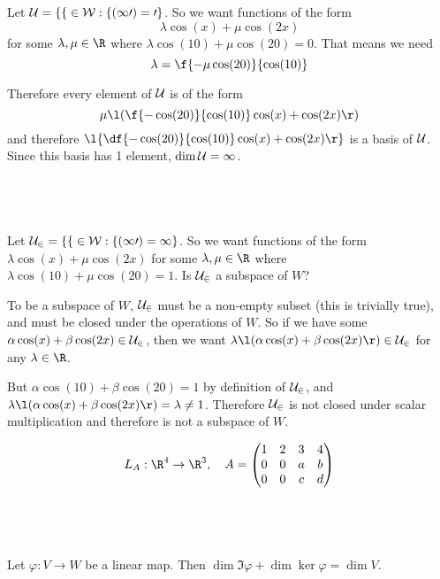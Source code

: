 \documentclass[a4paper]{article}
\begin{document}
Let $\cal U = \{ f \in W : f(10) = 0 \}$. So we want functions of the form $$\lambda \cos(x) + \mu \cos(2x)$$
for some $\lambda, \mu \in \R$ where $\lambda \cos(10) + \mu \cos(20) = 0$. That means we need $$\lambda = \f{-\mu \cos(20)}{\cos(10)}$$

Therefore every element of $\cal U$ is of the form $$\mu \l(\f{-\cos(20)}{\cos(10)} \cos(x) + \cos(2x) \r)$$
and therefore $\l\{ \df{-\cos(20)}{\cos(10)} \cos(x) + \cos(2x) \r\}$ is a basis of $\cal U$. Since this basis has 1 element, $\dim \cal U = 1$.

\subsection{~}

Let $\cal U_2 = \{ f \in W : f(10) = 1 \}$. So we want functions of the form $\lambda \cos(x) + \mu \cos(2x)$ for some $\lambda, \mu \in \R$ where $\lambda \cos(10) + \mu \cos(20) = 1$. Is $\cal U_2$ a subspace of $W$?

To be a subspace of $W$, $\cal U_2$ must be a non-empty subset (this is trivially true), and must be closed under the operations of $W$. So if we have some $\alpha \cos(x) + \beta \cos(2x) \in \cal U_2$, then we want $\lambda \l( \alpha \cos(x) + \beta \cos(2x) \r) \in \cal U_2$ for any $\lambda \in \R$.

But $\alpha \cos(10) + \beta \cos(20) = 1$ by definition of $\cal U_2$, and $\lambda \l( \alpha \cos(x) + \beta \cos(2x) \r) = \lambda \ne 1$. Therefore $\cal U_2$ is not closed under scalar multiplication and therefore is not a subspace of $W$.



$$L_A : \R^4 \to \R^3, \quad A = \begin{pmatrix} 1 & 2 & 3 & 4 \\ 0 & 0 & a & b \\ 0 & 0 & c & d \end{pmatrix}$$

\subsection{~}

Let $\varphi : V \to W$ be a linear map. Then $\dim \Im \varphi + \dim \ker \varphi = \dim V$.

\subsection{~}
\end{document}

